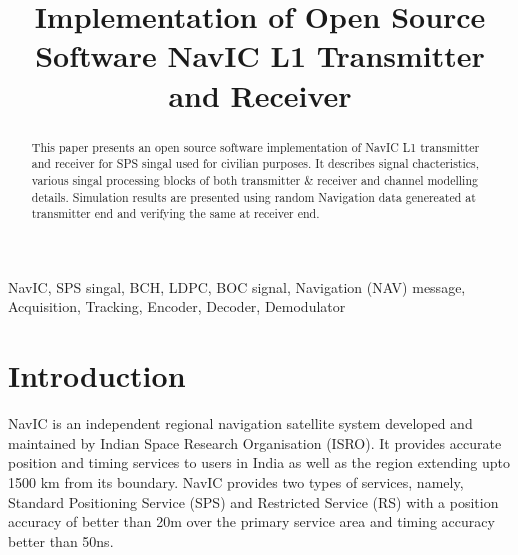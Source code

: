 \documentclass[conference]{IEEEtran}
\begin{document}
\title{Implementation of Open Source Software NavIC L1 Transmitter and Receiver\\
}

\author{
\and
{}
\and
{}

}

\maketitle

\begin{abstract}
This paper presents an open source software implementation of NavIC L1 transmitter and receiver for SPS singal used for civilian purposes. 
It describes signal chacteristics, various singal processing blocks of both transmitter \& receiver and channel modelling details. Simulation results 
are presented using random Navigation data genereated at transmitter end and verifying the same at receiver end.
\end{abstract}

\begin{IEEEkeywords}
NavIC, SPS singal, BCH, LDPC, BOC signal, Navigation (NAV) message, Acquisition, Tracking, Encoder, Decoder, Demodulator
\end{IEEEkeywords}

\section{Introduction}
NavIC is an independent regional navigation satellite system developed and maintained by Indian Space Research 
Organisation (ISRO). 
It provides accurate position and timing services to users in India as well as the region extending
upto 1500 km from its boundary. NavIC provides two types of services, namely, Standard Positioning 
Service (SPS) and Restricted Service (RS) with a position accuracy of better than 20m over the 
primary service area and timing accuracy better than 50ns.  
\end{document}
